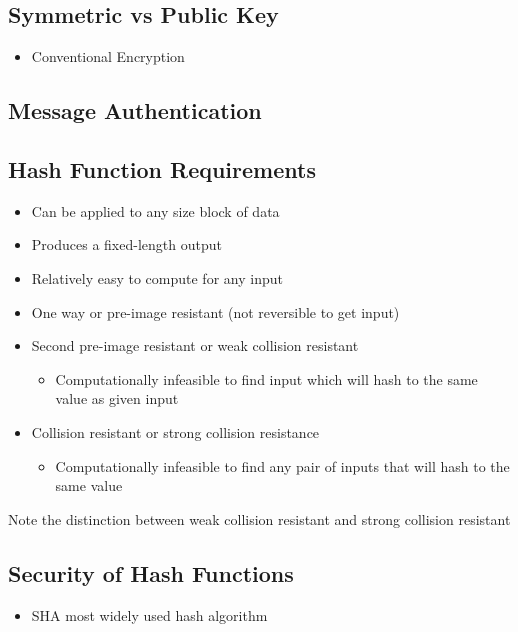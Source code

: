 \documentclass[11pt]{article}
\begin{document}
\subsection{Symmetric vs Public Key}
\label{sec:org26d4948}
\begin{itemize}
\item Conventional Encryption
\end{itemize}
\subsection{Message Authentication}
\label{sec:org6379134}
\subsection{Hash Function Requirements}
\label{sec:orgce7c9e0}
\begin{itemize}
\item Can be applied to any size block of data
\item Produces a fixed-length output
\item Relatively easy to compute for any input
\item One way or pre-image resistant (not reversible to get input)
\item Second pre-image resistant or weak collision resistant
\begin{itemize}
\item Computationally infeasible to find input which will hash to the same value as given input
\end{itemize}
\item Collision resistant or strong collision resistance
\begin{itemize}
\item Computationally infeasible to find any pair of inputs that will hash to the same value
\end{itemize}
\end{itemize}
Note the distinction between weak collision resistant and strong collision resistant 
\subsection{Security of Hash Functions}
\label{sec:org8272a83}
\begin{itemize}
\item SHA most widely used hash algorithm
\end{itemize}
\end{document}
